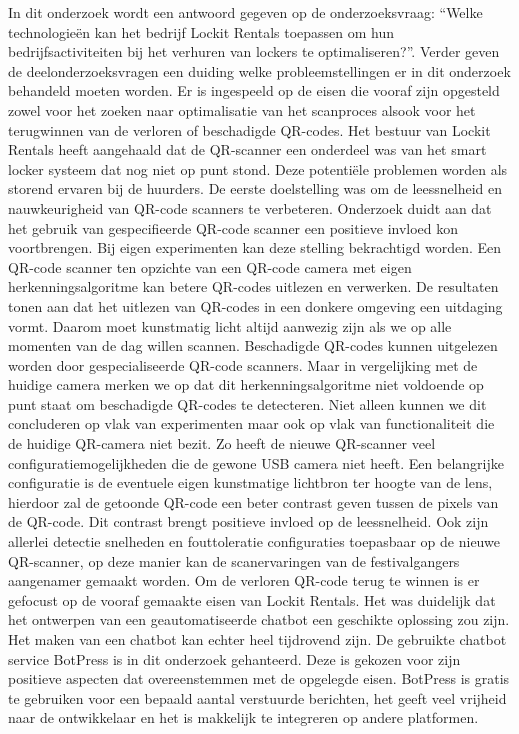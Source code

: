 In dit onderzoek wordt een antwoord gegeven op de onderzoeksvraag: “Welke technologieën kan het bedrijf Lockit Rentals toepassen om hun bedrijfsactiviteiten bij het verhuren van lockers te optimaliseren?”. Verder geven de deelonderzoeksvragen een duiding welke probleemstellingen er in dit onderzoek behandeld moeten worden. Er is ingespeeld op de eisen die vooraf zijn opgesteld zowel voor het zoeken naar optimalisatie van het scanproces alsook voor het terugwinnen van de verloren of beschadigde QR-codes. \newline
Het bestuur van Lockit Rentals heeft aangehaald dat de QR-scanner een onderdeel was van het smart locker systeem dat nog niet op punt stond. Deze potentiële problemen worden als storend ervaren bij de huurders. De eerste doelstelling was om de leessnelheid en nauwkeurigheid van QR-code scanners te verbeteren. Onderzoek duidt aan dat het gebruik van gespecifieerde QR-code scanner een positieve invloed kon voortbrengen. Bij eigen experimenten kan deze stelling bekrachtigd worden. Een QR-code scanner ten opzichte van een QR-code camera met eigen herkenningsalgoritme kan betere QR-codes  uitlezen en verwerken. De resultaten tonen aan dat het uitlezen van QR-codes in een donkere omgeving een uitdaging vormt. Daarom moet kunstmatig licht altijd aanwezig zijn als we op alle momenten van de dag willen scannen. Beschadigde QR-codes kunnen uitgelezen worden door gespecialiseerde QR-code scanners. Maar in vergelijking met de huidige camera merken we op dat dit herkenningsalgoritme niet voldoende op punt staat om beschadigde QR-codes te detecteren.\newline
Niet alleen kunnen we dit concluderen op vlak van experimenten maar ook op vlak van functionaliteit die de huidige QR-camera niet bezit. Zo heeft de nieuwe QR-scanner veel configuratiemogelijkheden die de gewone USB camera niet heeft. Een belangrijke configuratie is de eventuele eigen kunstmatige lichtbron ter hoogte van de lens, hierdoor zal de getoonde QR-code een beter contrast geven tussen de pixels van de QR-code. Dit contrast brengt positieve invloed op de leessnelheid. Ook zijn allerlei detectie snelheden en fouttoleratie configuraties toepasbaar op de nieuwe QR-scanner, op deze manier kan de scanervaringen van de festivalgangers aangenamer gemaakt worden.
\newline
Om de verloren QR-code terug te winnen is er gefocust op de vooraf gemaakte eisen van Lockit Rentals. Het was duidelijk dat het ontwerpen van een geautomatiseerde chatbot een geschikte oplossing zou zijn. Het maken van een chatbot kan echter heel tijdrovend zijn. De gebruikte chatbot service BotPress is in dit onderzoek gehanteerd. Deze is gekozen voor zijn positieve aspecten dat overeenstemmen met de opgelegde eisen. BotPress is gratis te gebruiken voor een bepaald aantal verstuurde berichten, het geeft veel vrijheid naar de ontwikkelaar en het is makkelijk te integreren op andere platformen.\newline
